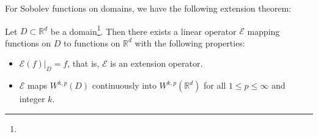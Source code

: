 
 For Sobolev functions on 
domains, we have the following extension theorem:
\begin{theorem}\label{thm:functionExtension}
  Let $D \subset\mathbb{R}^d$ be a  domain\footnote{}.
Then there exists a linear operator $\mathcal{E}$ mapping functions on $D$ to functions on $\mathbb{R}^d$ with the following properties:
\begin{itemize}
    \item $\mathcal{E}(f)|_D = f$, that is, $\mathcal{E}$ is an extension operator.
    \item $\mathcal{E}$ maps $W^{k,p}(D)$ continuously into
      $W^{k,p}(\mathbb{R}^d)$ for all $1\leq p\leq \infty$ and 
      integer $k$.
      
\end{itemize}
\end{theorem}

